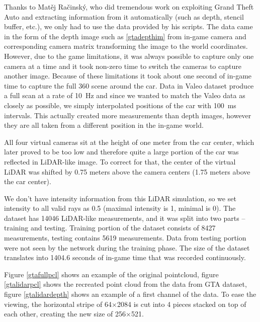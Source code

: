 Thanks to Matěj Račinský, who did tremendous work on exploiting Grand Theft Auto and extracting information from it automatically (such as depth, stencil buffer, etc.), we only had to use the data provided by his scripts. The data came in the form of the depth image such as \ref{gtadepthim} from in-game camera and corresponding camera matrix transforming the image to the world coordinates. However, due to the game limitations, it was always possible to capture only one camera at a time and it took non-zero time to switch the cameras to capture another image. Because of these limitations it took about one second of in-game time to capture the full 360\degree{} scene around the car. Data in Valeo dataset produce a full scan at a rate of 10~Hz and since we wanted to match the Valeo data as closely as possible, we simply interpolated positions of the car with 100~ms intervals. This actually created more measurements than depth images, however they are all taken from a different position in the in-game world.

All four virtual cameras sit at the height of one meter from the car center, which later proved to be too low and therefore quite a large portion of the car was reflected in LiDAR-like image. To correct for that, the center of the virtual LiDAR was shifted by 0.75 meters above the camera centers (1.75 meters above the car center).

We don't have intensity information from this LiDAR simulation, so we set intensity to all valid rays as 0.5 (maximal intensity is 1, minimal is 0). The dataset has 14046 LiDAR-like measurements, and it was split into two parts -- training and testing. Training portion of the dataset consists of 8427 measurements, testing contains 5619 measurements. Data from testing portion were not seen by the network during the training phase. The size of the dataset translates into 1404.6 seconds of in-game time that was recorded continuously.

Figure \ref{gtafullpcl} shows an example of the original pointcloud, figure \ref{gtalidarpcl} shows the recreated point cloud from the data from GTA dataset, figure \ref{gtalidardepth} shows an example of a first channel of the data. To ease the viewing, the horizontal stripe of 64$\times$2084 is cut into 4 pieces stacked on top of each other, creating the new size of 256$\times$521.

